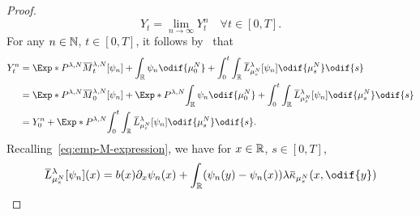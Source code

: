 \begin{proof}
  \begin{equation}
    Y_t = \lim_{n\to\infty} Y_t^n \quad \forall t \in [0,T].
  \end{equation}
  For any \( n \in \mathbb{N} \), \( t \in [0,T] \), it follows by~ that
  \begin{equation}
    \begin{split}
    Y_t^n
    &= \Exp*{P^{\lambda, N}}{\ol{M}_t^{\lambda, N}[\psi_n] + \int_\potspace \psi_n \odif{\mu_0^N} + \int_0^t \int_\potspace \ol{L}_{\mu_{s}^N}^{\lambda} [\psi_n] \odif{\mu_{s}^N} \odif{s} } \\
    &= \Exp*{P^{\lambda, N}}{\ol{M}_0^{\lambda, N}[\psi_n]} + \Exp*{P^{\lambda, N}}{\int_\potspace \psi_n \odif{\mu_0^N} + \int_0^t \int_\potspace \ol{L}_{\mu_{s}^N}^{\lambda} [\psi_n] \odif{\mu_{s}^N} \odif{s} } \\
    &= Y_0^n + \Exp*{P^{\lambda, N}}{\int_0^t \int_\potspace \ol{L}_{\mu_{s}^N}^{\lambda} [\psi_n] \odif{\mu_{s}^N} \odif{s} }.
    \end{split}
  \end{equation}
  Recalling~\eqref{eq:emp-M-expression}, we have for \( x \in \mathbb{R} \), \( s \in [0,T] \),
  \begin{equation}
    \begin{split}
    \ol{L}_{\mu_{s}^N}^{\lambda} [\psi_n](x)
    &= b(x) \partial_x \psi_n(x) + \int_\potspace (\psi_n(y) - \psi_n(x)) \lambda \ol{\kappa}_{\mu_{s}^N}(x, \odif{y}) \\

\end{split}
\end{equation}
\end{proof}
